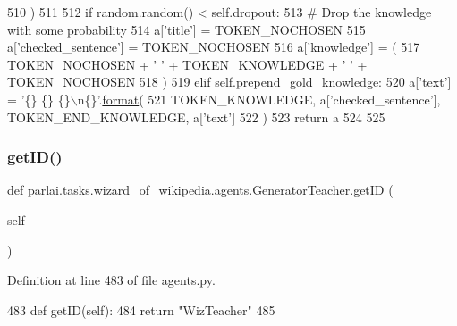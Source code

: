 \begin{DoxyCode}
510             )
511 
512         \textcolor{keywordflow}{if} random.random() < self.dropout:
513             \textcolor{comment}{# Drop the knowledge with some probability}
514             a[\textcolor{stringliteral}{'title'}] = TOKEN\_NOCHOSEN
515             a[\textcolor{stringliteral}{'checked\_sentence'}] = TOKEN\_NOCHOSEN
516             a[\textcolor{stringliteral}{'knowledge'}] = (
517                 TOKEN\_NOCHOSEN + \textcolor{stringliteral}{' '} + TOKEN\_KNOWLEDGE + \textcolor{stringliteral}{' '} + TOKEN\_NOCHOSEN
518             )
519         \textcolor{keywordflow}{elif} self.prepend\_gold\_knowledge:
520             a[\textcolor{stringliteral}{'text'}] = \textcolor{stringliteral}{'\{\} \{\} \{\}\(\backslash\)n\{\}'}.\hyperlink{namespaceparlai_1_1chat__service_1_1services_1_1messenger_1_1shared__utils_a32e2e2022b824fbaf80c747160b52a76}{format}(
521                 TOKEN\_KNOWLEDGE, a[\textcolor{stringliteral}{'checked\_sentence'}], TOKEN\_END\_KNOWLEDGE, a[\textcolor{stringliteral}{'text'}]
522             )
523         \textcolor{keywordflow}{return} a
524 
525 
\end{DoxyCode}
\mbox{\label{classparlai_1_1tasks_1_1wizard__of__wikipedia_1_1agents_1_1GeneratorTeacher_aa8bbfb04d73e1590cff4cfced7ed6502}} 
\subsubsection{\texorpdfstring{get\+I\+D()}{getID()}}
{\footnotesize\ttfamily def parlai.\+tasks.\+wizard\+\_\+of\+\_\+wikipedia.\+agents.\+Generator\+Teacher.\+get\+ID (\begin{DoxyParamCaption}\item[{}]{self }\end{DoxyParamCaption})}



Definition at line 483 of file agents.\+py.


\begin{DoxyCode}
483     \textcolor{keyword}{def }getID(self):
484         \textcolor{keywordflow}{return} \textcolor{stringliteral}{"WizTeacher"}
485 
\end{DoxyCode}


